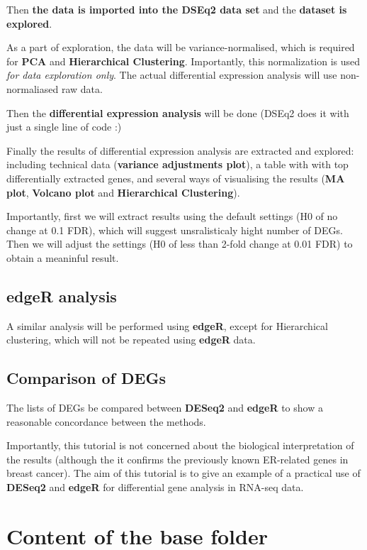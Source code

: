 \documentclass[]{book}
\begin{document}
Then \textbf{the data is imported into the DSEq2 data set} and the
\textbf{dataset is explored}.

As a part of exploration, the data will be variance-normalised, which is
required for \textbf{PCA} and \textbf{Hierarchical Clustering}.
Importantly, this normalization is used \emph{for data exploration
only}. The actual differential expression analysis will use
non-normaliased raw data.

Then the \textbf{differential expression analysis} will be done (DSEq2
does it with just a single line of code :)

Finally the results of differential expression analysis are extracted
and explored: including technical data (\textbf{variance adjustments
plot}), a table with with top differentially extracted genes, and
several ways of visualising the results (\textbf{MA plot},
\textbf{Volcano plot} and \textbf{Hierarchical Clustering}).

Importantly, first we will extract results using the default settings
(H0 of no change at 0.1 FDR), which will suggest unsralisticaly hight
number of DEGs. Then we will adjust the settings (H0 of less than 2-fold
change at 0.01 FDR) to obtain a meaninful result.

\subsection{edgeR analysis}\label{edger-analysis}

A similar analysis will be performed using \textbf{edgeR}, except for
Hierarchical clustering, which will not be repeated using \textbf{edgeR}
data.

\subsection{Comparison of DEGs}\label{comparison-of-degs}

The lists of DEGs be compared between \textbf{DESeq2} and \textbf{edgeR}
to show a reasonable concordance between the methods.

Importantly, this tutorial is not concerned about the biological
interpretation of the results (although the it confirms the previously
known ER-related genes in breast cancer). The aim of this tutorial is to
give an example of a practical use of \textbf{DESeq2} and \textbf{edgeR}
for differential gene analysis in RNA-seq data.

\section{Content of the base folder}\label{content-of-the-base-folder}
\end{document}
